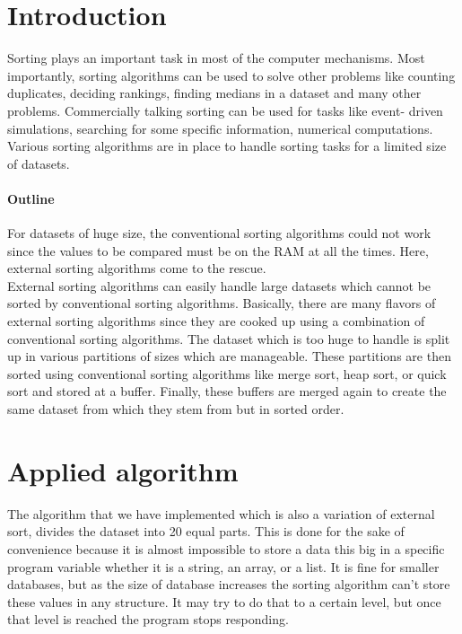 \documentclass[12pt]{article}
\begin{document}
\maketitle


\section{Introduction}

Sorting plays an important task in most of the computer mechanisms. Most importantly, sorting algorithms can be used to solve other problems like counting duplicates, deciding rankings, finding medians in a dataset and many other problems. Commercially talking sorting can be used for tasks like event- driven simulations, searching for some specific information, numerical computations. Various sorting algorithms are in place to handle sorting tasks for a limited size of datasets.

\paragraph{Outline}
For datasets of huge size, the conventional sorting algorithms could not work since the values to be compared must be on the RAM at all the times. Here, external sorting algorithms come to the rescue.\\
External sorting algorithms can easily handle large datasets which cannot be sorted by conventional sorting algorithms. Basically, there are many flavors of external sorting algorithms since they are cooked up using a combination of conventional sorting algorithms. 
The dataset which is too huge to handle is split up in various partitions of sizes which are manageable. These partitions are then sorted using conventional sorting algorithms like merge sort, heap sort, or quick sort and stored at a buffer. Finally, these buffers are merged again to create the same dataset from which they stem from but in sorted order.

\section{Applied algorithm}

The algorithm that we have implemented which is also a variation of external sort, divides the dataset into 20 equal parts. This is done for the sake of convenience because it is almost impossible to store a data this big in a specific program variable whether it is a string, an array, or a list. It is fine for smaller databases, but as the size of database increases the sorting algorithm can’t store these values in any structure. It may try to do that to a certain level, but once that level is reached the program stops responding.
\end{document}
